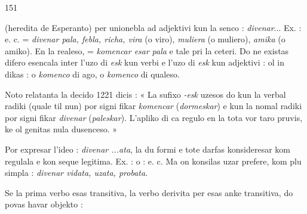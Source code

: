 \begin{VUpage}[155]{151}

\VUcontinue
(heredita de Esperanto) per  unionebla ad adjektivi\nl
kun la senco : \textit{divenar}... Ex. : \cc
{} e. c. =\nl
\textit{divenar pala, febla, richa, vira} (o viro), \textit{muliera} (o muliero),\nl
\textit{amika} (o amiko). En la realeso,  = \textit{komencar esar}\nl
\textit{pala} e tale pri la ceteri. Do ne existas difero esencala inter\nl
l'uzo di \textit{esk} kun verbi e l'uzo di \textit{esk} kun adjektivi : ol in\cc
dikas : o \textit{komenco} di ago, o \textit{komenco} di qualeso.

Noto relatanta la decido 1221 dicis : « La sufixo \textit{-esk}\nl
uzesos do kun la verbal radiki (quale til nun) por signi\cc
fikar \textit{komencar} (\textit{dormeskar}) e kun la nomal radiki por signi\cc
fikar \textit{divenar} (\textit{paleskar}). L'apliko di ca regulo en la tota vor\cc
taro pruvis, ke ol genitas nula dusenceso. »

Por expresar l'ideo : \textit{divenar ...ata}, la du formi \nl
e  tote darfas konsideresar kom regulala e kon\cc
seque legitima. Ex. :  o :\nl
{} e. c. Ma on konsilas uzar\nl
prefere, kom plu simpla : \textit{divenar vidata, uzata, probata.}

Se la prima verbo esas transitiva, la verbo derivita per\nl
{} esas anke transitiva, do povas havar objekto : \nl
{}


\end{VUpage}
